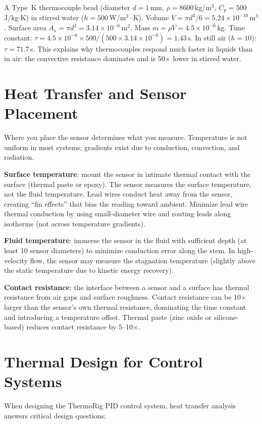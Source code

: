\documentclass[11pt,letterpaper,twoside,openany]{book}
\begin{document}
\begin{examplebox}
A Type~K thermocouple bead (diameter $d = 1$\,mm, $\rho = 8600$\,kg/m$^3$, $C_p = 500$\,J/kg$\cdot$K) in stirred water ($h = 500$\,W/m$^2\cdot$K). Volume $V = \pi d^3/6 = 5.24 \times 10^{-10}$\,m$^3$. Surface area $A_s = \pi d^2 = 3.14 \times 10^{-6}$\,m$^2$. Mass $m = \rho V = 4.5 \times 10^{-6}$\,kg. Time constant: $\tau = 4.5 \times 10^{-6} \times 500 / (500 \times 3.14 \times 10^{-6}) = 1.43$\,s. In still air ($h = 10$): $\tau = 71.7$\,s. This explains why thermocouples respond much faster in liquids than in air: the convective resistance dominates and is 50$\times$ lower in stirred water.
\end{examplebox}

\section{Heat Transfer and Sensor Placement}
Where you place the sensor determines what you measure. Temperature is not uniform in most systems; gradients exist due to conduction, convection, and radiation.

\textbf{Surface temperature}: mount the sensor in intimate thermal contact with the surface (thermal paste or epoxy). The sensor measures the surface temperature, not the fluid temperature. Lead wires conduct heat away from the sensor, creating ``fin effects'' that bias the reading toward ambient. Minimize lead wire thermal conduction by using small-diameter wire and routing leads along isotherms (not across temperature gradients).

\textbf{Fluid temperature}: immerse the sensor in the fluid with sufficient depth (at least 10 sensor diameters) to minimize conduction error along the stem. In high-velocity flow, the sensor may measure the stagnation temperature (slightly above the static temperature due to kinetic energy recovery).

\textbf{Contact resistance}: the interface between a sensor and a surface has thermal resistance from air gaps and surface roughness. Contact resistance can be 10$\times$ larger than the sensor's own thermal resistance, dominating the time constant and introducing a temperature offset. Thermal paste (zinc oxide or silicone-based) reduces contact resistance by 5--10$\times$.

\section{Thermal Design for Control Systems}
When designing the ThermoRig PID control system, heat transfer analysis answers critical design questions:
\end{document}
